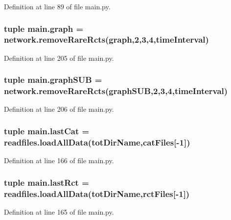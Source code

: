 Definition at line 89 of file main.\-py.

\hypertarget{a00117_a4cfdc01ecc5ad260a4f30c9353e3d856}{
\subsubsection[{graph}]{\setlength{\rightskip}{0pt plus 5cm}tuple main.\-graph = network.\-remove\-Rare\-Rcts(graph,2,3,4,{\bf time\-Interval})}}\label{a00117_a4cfdc01ecc5ad260a4f30c9353e3d856}


Definition at line 205 of file main.\-py.

\hypertarget{a00117_ab96de87bc8cbe59221256af996bdc43e}{
\subsubsection[{graph\-S\-U\-B}]{\setlength{\rightskip}{0pt plus 5cm}tuple main.\-graph\-S\-U\-B = network.\-remove\-Rare\-Rcts(graph\-S\-U\-B,2,3,4,{\bf time\-Interval})}}\label{a00117_ab96de87bc8cbe59221256af996bdc43e}


Definition at line 206 of file main.\-py.

\hypertarget{a00117_ad65fb0887c659a9bf884cba677b67272}{
\subsubsection[{last\-Cat}]{\setlength{\rightskip}{0pt plus 5cm}tuple main.\-last\-Cat = readfiles.\-load\-All\-Data({\bf tot\-Dir\-Name},{\bf cat\-Files}\mbox{[}-\/1\mbox{]})}}\label{a00117_ad65fb0887c659a9bf884cba677b67272}


Definition at line 166 of file main.\-py.

\hypertarget{a00117_a519d451fb14acb6fb50a108ac2b8b261}{
\subsubsection[{last\-Rct}]{\setlength{\rightskip}{0pt plus 5cm}tuple main.\-last\-Rct = readfiles.\-load\-All\-Data({\bf tot\-Dir\-Name},{\bf rct\-Files}\mbox{[}-\/1\mbox{]})}}\label{a00117_a519d451fb14acb6fb50a108ac2b8b261}


Definition at line 165 of file main.\-py.

